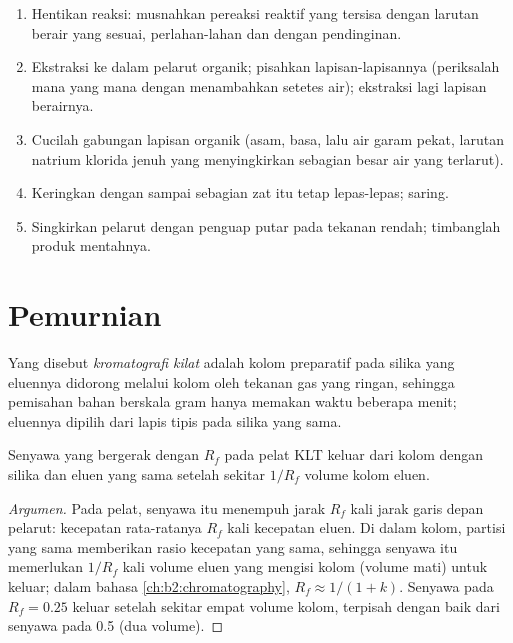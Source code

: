 \begin{method}\label{met:b2:lab-techniques-2:work-up}
\begin{enumerate}
  \item Hentikan reaksi: musnahkan pereaksi reaktif yang tersisa dengan
        larutan berair yang sesuai, perlahan-lahan dan dengan pendinginan.
  \item Ekstraksi ke dalam pelarut organik; pisahkan lapisan-lapisannya
        (periksalah mana yang mana dengan menambahkan setetes air);
        ekstraksi lagi lapisan berairnya.
  \item Cucilah gabungan lapisan organik (asam, basa, lalu air garam pekat,
        larutan natrium klorida jenuh yang menyingkirkan sebagian besar air
        yang terlarut).
  \item Keringkan dengan  sampai sebagian zat itu tetap
        lepas-lepas; saring.
  \item Singkirkan pelarut dengan penguap putar pada tekanan rendah;
        timbanglah produk mentahnya.
\end{enumerate}
\end{method}

\section{Pemurnian}

\begin{definition}\label{def:b2:lab-techniques-2:flash}
Yang disebut \emph{kromatografi kilat} adalah
 kolom preparatif pada silika yang eluennya didorong melalui
kolom oleh tekanan gas yang ringan, sehingga pemisahan bahan berskala gram
hanya memakan waktu beberapa menit; eluennya dipilih dari 
lapis tipis pada silika yang sama.
\end{definition}

\begin{proposition}\label{prop:b2:lab-techniques-2:column-volumes}
Senyawa yang bergerak dengan $R_f$ pada pelat KLT keluar dari kolom dengan
silika dan eluen yang sama setelah sekitar $1/R_f$ volume kolom eluen.
\end{proposition}

\begin{proof}[Argumen]
Pada pelat, senyawa itu menempuh jarak $R_f$ kali jarak garis depan pelarut:
kecepatan rata-ratanya $R_f$
kali kecepatan eluen. Di dalam kolom, partisi yang sama memberikan rasio
kecepatan yang sama, sehingga senyawa itu memerlukan $1/R_f$ kali volume
eluen yang mengisi kolom (volume mati) untuk keluar; dalam bahasa
\cref{ch:b2:chromatography}, $R_f \approx 1/(1 + k)$. Senyawa pada $R_f = 0.25$
keluar setelah sekitar empat volume kolom, terpisah dengan baik dari senyawa
pada 0.5 (dua volume).
\end{proof}

